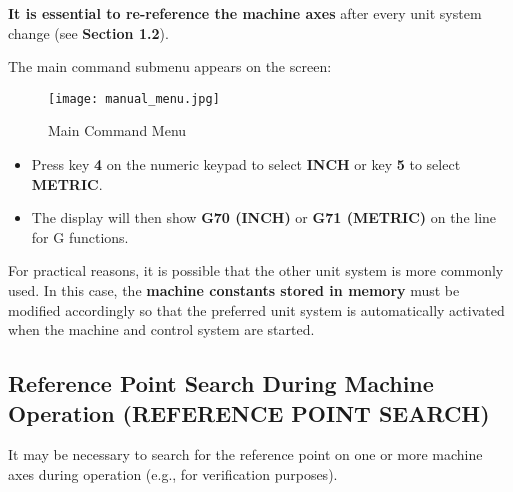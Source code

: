\textbf{It is essential to re-reference the machine axes} after every unit system change (see \textbf{Section 1.2}).

\procedure

\begin{itemize}
\end{itemize}

\vspace{.5cm}

\begin{itemize}
\end{itemize}

\newpage

The main command submenu appears on the screen:

\begin{figure}[h]
    \centering
    \texttt{[image: manual\_menu.jpg]}
    \caption{Main Command Menu}
\end{figure}

\begin{itemize}
    \item Press key \textbf{4} on the numeric keypad to select \textbf{INCH} or key \textbf{5} to select \textbf{METRIC}.
\end{itemize}

\begin{itemize}
    \item The display will then show \textbf{G70 (INCH)} or \textbf{G71 (METRIC)} on the line for G functions.
\end{itemize}

\notes

For practical reasons, it is possible that the other unit system is more commonly used. In this case, the \textbf{machine constants stored in memory} must be modified accordingly so that the preferred unit system is automatically activated when the machine and control system are started.

\newpage

\subsection{Reference Point Search During Machine Operation (REFERENCE POINT SEARCH)}

It may be necessary to search for the reference point on one or more machine axes during operation (e.g., for verification purposes).

